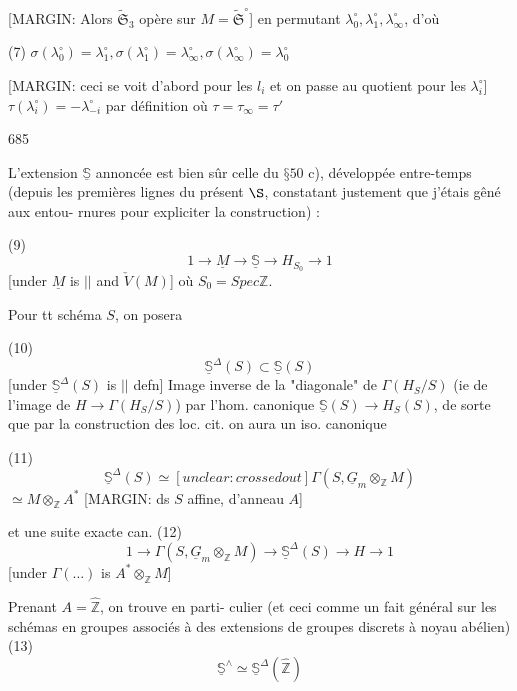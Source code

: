[MARGIN: Alors $\tilde{\mathfrak{S}}_3$ opère sur $M = \tilde{\mathfrak{S}}^\circ$]
en permutant $\lambda_0^\circ, \lambda_1^\circ, \lambda_{\infty}^\circ$, d'où

(7) $\sigma(\lambda_0^\circ) = \lambda_1^\circ, \sigma(\lambda_1^\circ) = \lambda_{\infty}^\circ, \sigma(\lambda_{\infty}^\circ) = \lambda_0^\circ$

[MARGIN: ceci se voit d'abord pour les $l_i$ et on passe au quotient pour les $\lambda_i^\circ$]
$\tau(\lambda_i^\circ) = - \lambda_{-i}^\circ$ par définition
où $\tau = \tau_{\infty} = \tau'$

\newpage


685

L'extension $\underline{\mathbb{S}}$ annoncée est bien sûr
celle du $§ 50$ c), développée entre-temps (depuis
les premières lignes du présent $\S$, constatant
justement que j'étais gêné aux entou-
rnures pour expliciter la construction) :

(9) $$1 \to \underline{M} \to \underline{\mathbb{S}} \to H_{S_0} \to 1$$
[under $\underline{M}$ is $||$ and $\check{V}(M)$]
où $S_0 = Spec \mathbb{Z}$.

Pour tt schéma $S$, on posera

(10) $$\underline{\mathbb{S}}^\Delta(S) \subset \underline{\mathbb{S}}(S)$$
[under $\underline{\mathbb{S}}^\Delta(S)$ is $||$ defn]
Image inverse de la "diagonale" de
$\Gamma(H_S/S)$ (ie de l'image de $H \to \Gamma(H_S/S)$)
par l'hom. canonique $\underline{\mathbb{S}}(S) \to H_S(S)$,
de sorte que par la construction des
loc. cit. on aura un iso. canonique

(11) $$\underline{\mathbb{S}}^\Delta(S) \simeq [unclear: crossed out] \Gamma(S, \underline{G}_m \otimes_{\mathbb{Z}} M)$$
$\simeq M \otimes_{\mathbb{Z}} A^*$
[MARGIN: ds $S$ affine, d'anneau $A$]

et une suite exacte can.
(12) $$1 \to \Gamma(S, \underline{G}_m \otimes_{\mathbb{Z}} M) \to \underline{\mathbb{S}}^\Delta(S) \to H \to 1$$
[under $\Gamma(\dots)$ is $A^* \otimes_{\mathbb{Z}} M$]

Prenant $A = \hat{\mathbb{Z}}$, on trouve en parti-
culier (et ceci comme un fait
général sur les schémas en groupes
associés à des extensions de groupes
discrets à noyau abélien)
(13) $$\underline{\mathbb{S}}^\wedge \simeq \underline{\mathbb{S}}^\Delta(\hat{\mathbb{Z}})$$

\newpage


